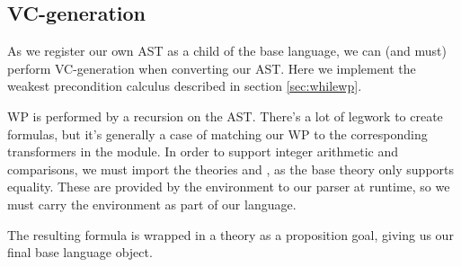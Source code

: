 \subsection{VC-generation}

As we register our own AST as a child of the base language,
we can (and must) perform VC-generation when converting our AST.
Here we implement the weakest precondition calculus described in section \ref{sec:whilewp}.

WP is performed by a recursion on the AST.
There's a lot of legwork to create formulas,
but it's generally a case of matching our WP to the corresponding transformers in the 
module.
In order to support integer arithmetic and comparisons,
we must import the theories  and ,
as the base theory only supports equality.
These are provided by the environment to our parser at runtime,
so we must carry the environment as part of our language.

The resulting formula is wrapped in a theory as a proposition goal,
giving us our final base language object.
